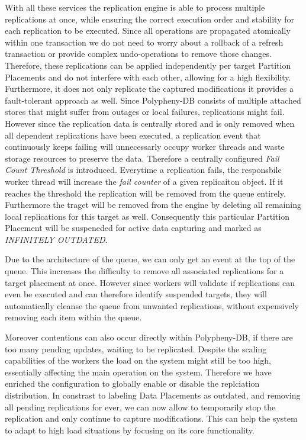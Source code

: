 \begin{description}
\end{description}



With all these services the replication engine is able to process multiple replications at once, while ensuring the correct execution order and stability
for each replication to be executed. 
Since all operations are propagated atomically within one transaction we do not need to worry about a rollback of a refresh transaction or provide complex undo-operations 
to remove those changes. Therefore, these replications can be applied independently per target Partition Placements and do not interfere with each other, 
allowing for a high flexibility.\\
Furthermore, it does not only replicate the captured modifications it provides a fault-tolerant approach as well. 
Since Polypheny-DB consists of multiple attached stores that might suffer from outages or local failures, replications might fail.
However since the replication data is centrally stored and is only removed when all dependent replications have been executed, 
a replication event that continuously keeps failing will unnecessarly occupy worker threads and waste storage resources to preserve the data.
Therefore a centrally configured \emph{Fail Count Threshold} is introduced. Everytime a replication fails, the responsbile worker thread will increase the \textit{fail counter} 
of a given replicaiton object. If it reaches the threshold the replication will be removed from the queue entirely. 
Furthermore the traget will be removed from the engine by deleting all remaining local replications for this target as well.
Consequently this particular Partition Placement will be suspeneded for active data capturing and marked as \emph{INFINITELY OUTDATED}.

Due to the architecture of the queue, we can only get an event at the top of the queue. This increases the difficulty to remove all associated replications 
for a target placement at once. However since workers will validate if replications can even be executed and can therefore identify suspended targets, they will
automatically cleanse the queue from unwanted replications, without expensively removing each item within the queue.

Moreover contentions can also occur directly within Polypheny-DB, if there are too many pending updates, waiting to be replicated.
Despite the scaling capabilities of the workers the load on the system might still be too high, essentially affecting the main operation on the system.
Therefore we have enriched the configuration to globally enable or disable the replciation distribution. In constrast to labeling Data Placements as outdated, 
and removing all pending replications for ever, we can now allow to temporarily stop the replication and only continue to capture modifications. This can help the system
to adapt to high load situations by focusing on its core functionality.\\


